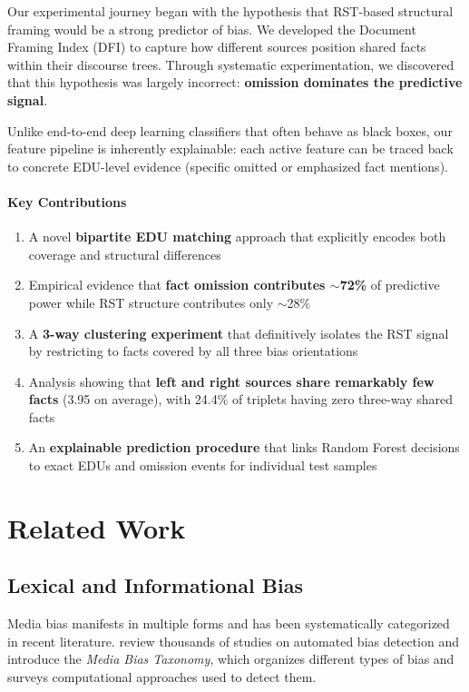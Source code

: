 \documentclass[11pt]{article}
\begin{document}
Our experimental journey began with the hypothesis that RST-based structural framing would be a strong predictor of bias. We developed the Document Framing Index (DFI) to capture how different sources position shared facts within their discourse trees. Through systematic experimentation, we discovered that this hypothesis was largely incorrect: \textbf{omission dominates the predictive signal}.

Unlike end-to-end deep learning classifiers that often behave as black boxes, our feature pipeline is inherently explainable: each active feature can be traced back to concrete EDU-level evidence (specific omitted or emphasized fact mentions).

\paragraph{Key Contributions}
\begin{enumerate}
    \item A novel \textbf{bipartite EDU matching} approach that explicitly encodes both coverage and structural differences
    \item Empirical evidence that \textbf{fact omission contributes $\sim$72\%} of predictive power while RST structure contributes only $\sim$28\%
    \item A \textbf{3-way clustering experiment} that definitively isolates the RST signal by restricting to facts covered by all three bias orientations
    \item Analysis showing that \textbf{left and right sources share remarkably few facts} (3.95 on average), with 24.4\% of triplets having zero three-way shared facts
    \item An \textbf{explainable prediction procedure} that links Random Forest decisions to exact EDUs and omission events for individual test samples
\end{enumerate}

\section{Related Work}

\subsection{Lexical and Informational Bias}

Media bias manifests in multiple forms and has been systematically categorized in recent literature. \citet{spinde2024mediabiastaxonomysystematic} review thousands of studies on automated bias detection and introduce the \emph{Media Bias Taxonomy}, which organizes different types of bias and surveys computational approaches used to detect them.
\end{document}
